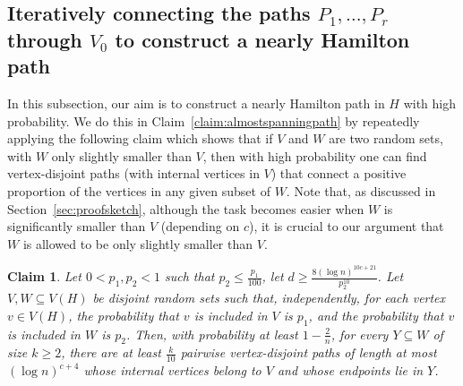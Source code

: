 \documentclass[10pt]{article}
\theoremstyle{plain}
\numberwithin{theorem}{section}
\newtheorem{claim}{Claim}[theorem]
\theoremstyle{definition}
\theoremstyle{remark}
\theoremstyle{plain}
\begin{document}
\subsection{Iteratively connecting the paths \texorpdfstring{$P_1, \ldots, P_r$}{P1, \ldots, Pr} through \texorpdfstring{$V_0$}{V0} to construct a nearly Hamilton path}
\label{subsec:joiningthepaths}
    In this subsection, our aim is to construct a nearly Hamilton path in $H$ with high probability. 
	We do this in Claim~\ref{claim:almostspanningpath} by repeatedly applying the following claim which shows that if $V$ and $W$ are two random sets, with $W$ only slightly smaller than $V$, then with high probability one can find vertex-disjoint paths (with internal vertices in $V$) that connect a positive proportion of the vertices in any given subset of $W$. Note that, as discussed in Section~\ref{sec:proofsketch}, although the task becomes easier when $W$ is significantly smaller than $V$ (depending on $c$), it is crucial to our argument that $W$ is allowed to be only slightly smaller than $V$.

	\begin{claim}
		\label{claim:connectingverticesofY}
		Let $0 < p_1 , p_2 < 1$ such that $p_2 \le \frac{p_1}{100}$, let $d \ge \frac{8 (\log n)^{10c +21}}{p_2^{10}}$. Let $V, W \subseteq V(H)$ be disjoint random sets such that, independently, for each vertex $v \in V(H)$, the probability that $v$ is included in $V$ is $p_1$, and the probability that $v$ is included in $W$ is $p_2$. Then, with probability at least $1 - \frac{2}{n}$, for every $Y \subseteq W$ of size $k \ge 2$, there are at least $\frac{k}{10}$ pairwise vertex-disjoint paths of length at most $(\log n)^{c+4}$ whose internal vertices belong to $V$ and whose endpoints lie in $Y$. 
	\end{claim}
\end{document}
